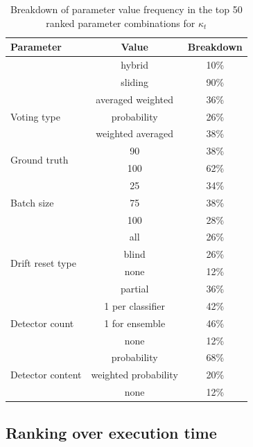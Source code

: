 \begin{table}[]
\centering
\caption{\label{table:rank_kappa_breakdown}Breakdown of parameter value frequency in the top 50 ranked parameter combinations for $\kappa_t$}
\begin{tabular}{|l|c|c|}
\hline
\textbf{Parameter} & \textbf{Value} & \textbf{Breakdown} \\ \hline \hhline{===}
\multirow{2}{*}{Window type} & hybrid & 10\% \\ \cline{2-3} 
 & sliding & 90\% \\ \hline
\multirow{3}{*}{Voting type} & averaged weighted & 36\% \\ \cline{2-3} 
 & probability & 26\% \\ \cline{2-3} 
 & weighted averaged & 38\% \\ \hline
\multirow{2}{*}{Ground truth} & 90 & 38\% \\ \cline{2-3} 
 & 100 & 62\% \\ \hline
\multirow{3}{*}{Batch size} & 25 & 34\% \\ \cline{2-3} 
 & 75 & 38\% \\ \cline{2-3} 
 & 100 & 28\% \\ \hline
\multirow{4}{*}{Drift reset type} & all & 26\% \\ \cline{2-3} 
 & blind & 26\% \\ \cline{2-3} 
 & none & 12\% \\ \cline{2-3} 
 & partial & 36\% \\ \hline
\multirow{3}{*}{Detector count} & 1 per classifier & 42\% \\ \cline{2-3} 
 & 1 for ensemble & 46\% \\ \cline{2-3} 
 & none & 12\% \\ \hline
\multirow{3}{*}{Detector content} & probability & 68\% \\ \cline{2-3} 
 & weighted probability & 20\% \\ \cline{2-3} 
 & none & 12\% \\ \hline
\end{tabular}
\end{table}

\subsection{Ranking over execution time}

